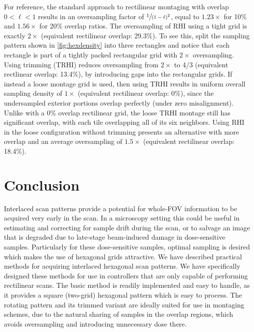 \documentclass[aip, amsmath, amssymb, nobibnotes, nofootinbib, citeautoscript, reprint, superscriptaddress]{revtex4-2}
\begin{document}
    For reference, the standard approach to rectilinear montaging with overlap $0<\ell<1$ results in an oversampling factor of $\sfrac{1}{(1-\ell)^2}$, equal to $1.23\times$ for 10\% and $1.56\times$ for 20\% overlap ratios.
    The oversampling of RHI using a tight grid is exactly $2\times$ (equivalent rectilinear overlap: 29.3\%).
    To see this, split the sampling pattern shown in \autoref{fig:hexdensity} into three rectangles and notice that each rectangle is part of a tightly packed rectangular grid with $2\times$ oversampling.
    Using trimming (TRHI) reduces oversampling from $2\times$ to 4/3 (equivalent rectlinear overlap: 13.4\%), by introducing gaps into the rectangular grids.
    If instead a loose montage grid is used, then using TRHI results in uniform overall sampling density of $1\times$ (equivalent rectilinear overlap: 0\%), since the undersampled exterior portions overlap perfectly (under zero misalignment).
    Unlike with a 0\% overlap rectilinear grid, the loose TRHI montage still has significant overlap, with each tile overlapping all of its six neighbors.
    Using RHI in the loose configuration without trimming presents an alternative with more overlap and an average oversampling of $1.5\times$ (equivalent rectilinear overlap: 18.4\%).

    \section{\label{sec:conclusion}Conclusion}

    Interlaced scan patterns provide a potential for whole-FOV information to be acquired very early in the scan.
    In a microscopy setting this could be useful in estimating and correcting for sample drift during the scan, or to salvage an image that is degraded due to late-stage beam-induced damage in dose-sensitive samples.
    Particularly for these dose-sensitive samples, optimal sampling is desired which makes the use of hexagonal grids attractive.
    We have described practical methods for acquiring interlaced hexagonal scan patterns.
    We have specifically designed these methods for use in controllers that are only
    capable of performing rectilinear scans.
    The basic method is readily implemented and easy to handle, as it provides a square (two-grid) hexagonal pattern which is easy to process.
    The rotating pattern and its trimmed variant are ideally suited for use in montaging schemes, due to the natural sharing of samples in the overlap regions, which avoids oversampling and introducing unnecessary dose there.
\end{document}

